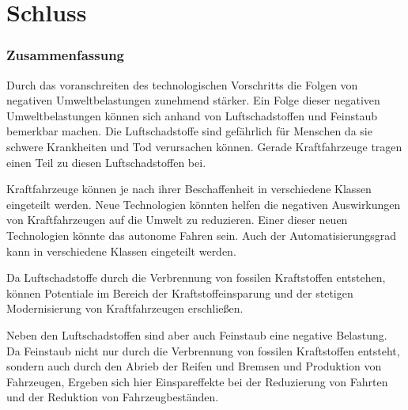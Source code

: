 \chapter{Schluss}

\subsection{Zusammenfassung}
Durch das voranschreiten des technologischen Vorschritts die Folgen von negativen Umweltbelastungen zunehmend stärker.
Ein Folge dieser negativen Umweltbelastungen können sich anhand von Luftschadstoffen und Feinstaub bemerkbar machen.
Die Luftschadstoffe sind gefährlich für Menschen da sie schwere Krankheiten und Tod verursachen können.
Gerade Kraftfahrzeuge tragen einen Teil zu diesen Luftschadstoffen bei.

Kraftfahrzeuge können je nach ihrer Beschaffenheit in verschiedene Klassen eingeteilt werden.
Neue Technologien könnten helfen die negativen Auswirkungen von Kraftfahrzeugen auf die Umwelt zu reduzieren.
Einer dieser neuen Technologien könnte das autonome Fahren sein.
Auch der Automatisierungsgrad kann in verschiedene Klassen eingeteilt werden.

Da Luftschadstoffe durch die Verbrennung von fossilen Kraftstoffen entstehen,
können Potentiale im Bereich der Kraftstoffeinsparung und der stetigen Modernisierung von Kraftfahrzeugen erschließen.

Neben den Luftschadstoffen sind aber auch Feinstaub eine negative Belastung.
Da Feinstaub nicht nur durch die Verbrennung von fossilen Kraftstoffen entsteht,
sondern auch durch den Abrieb der Reifen und Bremsen und Produktion von Fahrzeugen,
Ergeben sich hier Einspareffekte bei der Reduzierung von Fahrten und der Reduktion von Fahrzeugbeständen.

